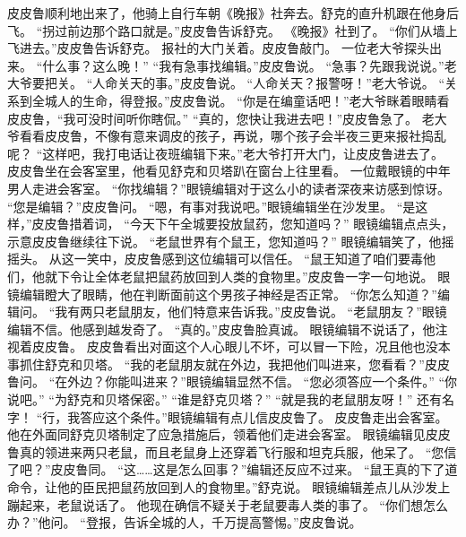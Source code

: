 \documentclass[a4paper,12pt,UTF8,twoside]{ctexbook}
\begin{document}
        皮皮鲁顺利地出来了，他骑上自行车朝《晚报》社奔去。舒克的直升机跟在他身后飞。 
        “拐过前边那个路口就是。”皮皮鲁告诉舒克。 
        《晚报》社到了。 
        “你们从墙上飞进去。”皮皮鲁告诉舒克。 
        报社的大门关着。皮皮鲁敲门。 
        一位老大爷探头出来。 
        “什么事？这么晚！” 
        “我有急事找编辑。”皮皮鲁说。 
        “急事？先跟我说说。”老大爷要把关。 
        “人命关天的事。”皮皮鲁说。 
        “人命关天？报警呀！”老大爷说。 
        “关系到全城人的生命，得登报。”皮皮鲁说。 
        “你是在编童话吧！”老大爷眯着眼睛看皮皮鲁，“我可没时间听你瞎侃。” 
        “真的，您快让我进去吧！”皮皮鲁急了。 
        老大爷看看皮皮鲁，不像有意来调皮的孩子，再说，哪个孩子会半夜三更来报社捣乱呢？ 
        “这样吧，我打电话让夜班编辑下来。”老大爷打开大门，让皮皮鲁进去了。 
        皮皮鲁坐在会客室里，他看见舒克和贝塔趴在窗台上往里看。 
        一位戴眼镜的中年男人走进会客室。 
        “你找编辑？”眼镜编辑对于这么小的读者深夜来访感到惊讶。 
        “您是编辑？”皮皮鲁问。 
        “嗯，有事对我说吧。”眼镜编辑坐在沙发里。 
        “是这样，”皮皮鲁措着词，  “今天下午全城要投放鼠药，您知道吗？” 
        眼镜编辑点点头，示意皮皮鲁继续往下说。 
        “老鼠世界有个鼠王，您知道吗？” 
        眼镜编辑笑了，他摇摇头。 
        从这一笑中，皮皮鲁感到这位编辑可以信任。 
        “鼠王知道了咱们要毒他们，他就下令让全体老鼠把鼠药放回到人类的食物里。”皮皮鲁一字一句地说。 
        眼镜编辑瞪大了眼睛，他在判断面前这个男孩子神经是否正常。 
        “你怎么知道？”编辑问。 
        “我有两只老鼠朋友，他们特意来告诉我。”皮皮鲁说。 
        “老鼠朋友？”眼镜编辑不信。他感到越发奇了。 
        “真的。”皮皮鲁脸真诚。 
        眼镜编辑不说话了，他注视着皮皮鲁。 
        皮皮鲁看出对面这个人心眼儿不坏，可以冒一下险，况且他也没本事抓住舒克和贝塔。 
        “我的老鼠朋友就在外边，我把他们叫进来，您看看？”皮皮鲁问。 
        “在外边？你能叫进来？”眼镜编辑显然不信。 
        “您必须答应一个条件。” 
        “你说吧。” 
        “为舒克和贝塔保密。” 
        “谁是舒克贝塔？” 
        “就是我的老鼠朋友呀！” 
        还有名字！ 
        “行，我答应这个条件。”眼镜编辑有点儿信皮皮鲁了。 
        皮皮鲁走出会客室。 
        他在外面同舒克贝塔制定了应急措施后，领着他们走进会客室。 
        眼镜编辑见皮皮鲁真的领进来两只老鼠，而且老鼠身上还穿着飞行服和坦克兵服，他呆了。 
        “您信了吧？”皮皮鲁同。 
        “这……这是怎么回事？”编辑还反应不过来。 
        “鼠王真的下了道命令，让他的臣民把鼠药放回到人的食物里。”舒克说。 
        眼镜编辑差点儿从沙发上蹦起来，老鼠说话了。 
        他现在确信不疑关于老鼠要毒人类的事了。 
        “你们想怎么办？”他问。 
        “登报，告诉全城的人，千万提高警惕。”皮皮鲁说。 
\end{document}
